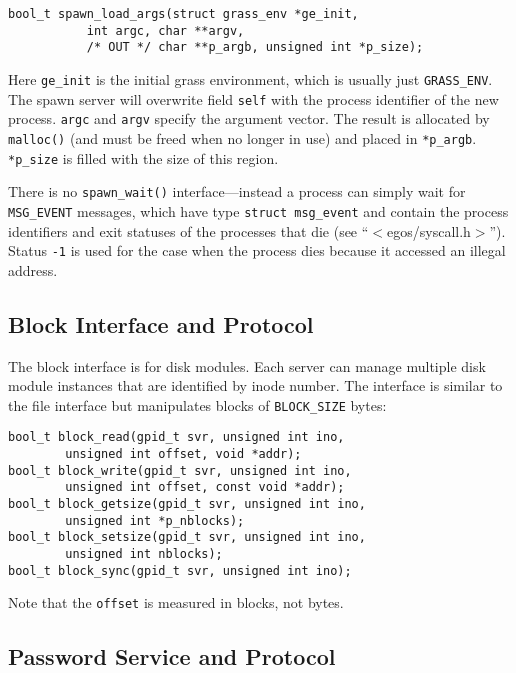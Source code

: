 \documentclass{article}
\begin{document}
\begin{verbatim}
bool_t spawn_load_args(struct grass_env *ge_init,
           int argc, char **argv,
           /* OUT */ char **p_argb, unsigned int *p_size);
\end{verbatim}

Here \texttt{ge\_init} is the initial grass environment, which
is usually just \texttt{GRASS\_ENV}.  The spawn server will overwrite
field \texttt{self} with the process identifier of the new process.
\texttt{argc} and \texttt{argv} specify the argument vector.
The result is allocated by \texttt{malloc()} (and must be freed when
no longer in use) and placed in \texttt{*p\_argb}.  \texttt{*p\_size}
is filled with the size of this region.

There is no \texttt{spawn\_wait()} interface---instead a process can
simply wait for \texttt{MSG\_EVENT} messages, which have type
\texttt{struct msg\_event} and contain the process identifiers and
exit statuses of the processes that die (see ``$<$egos/syscall.h$>$'').
Status \texttt{-1} is used for the case when the process dies
because it accessed an illegal address.

\subsection{Block Interface and Protocol}

The block interface is for disk modules.  Each server
can manage multiple disk module instances that are identified by inode number.
The interface is similar to the file interface but manipulates
blocks of \texttt{BLOCK\_SIZE} bytes:

\begin{verbatim}
bool_t block_read(gpid_t svr, unsigned int ino,
        unsigned int offset, void *addr);
bool_t block_write(gpid_t svr, unsigned int ino,
        unsigned int offset, const void *addr);
bool_t block_getsize(gpid_t svr, unsigned int ino,
        unsigned int *p_nblocks);
bool_t block_setsize(gpid_t svr, unsigned int ino,
        unsigned int nblocks);
bool_t block_sync(gpid_t svr, unsigned int ino);
\end{verbatim}

Note that the \texttt{offset} is measured in blocks, not bytes.

\subsection{Password Service and Protocol}
\end{document}
